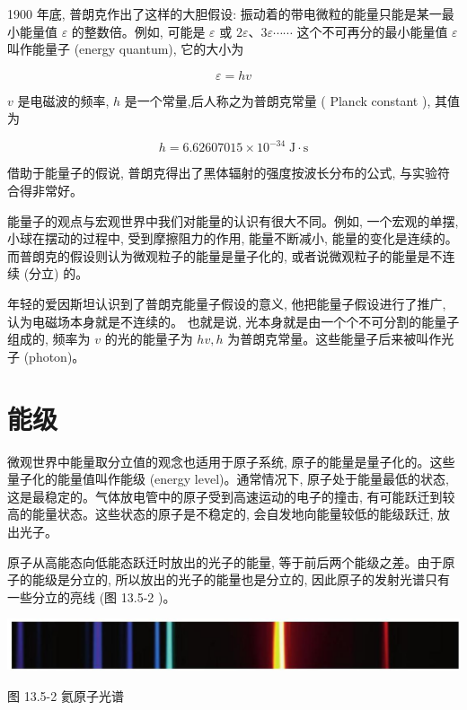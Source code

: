 \documentclass[10pt]{article}
\begin{document}
1900 年底, 普朗克作出了这样的大胆假设: 振动着的带电微粒的能量只能是某一最小能量值 \(\varepsilon\) 的整数倍。例如, 可能是 \(\varepsilon\) 或 \({2\varepsilon }\text{、}{3\varepsilon }\cdots \cdots\) 这个不可再分的最小能量值 \(\varepsilon\) 叫作能量子 (energy quantum), 它的大小为

\[
\varepsilon = {hv}
\]

\(v\) 是电磁波的频率, \(h\) 是一个常量,后人称之为普朗克常量 ( Planck constant ), 其值为

\[
h = {6.62607015} \times {10}^{-{34}}\mathrm{\;J} \cdot \mathrm{s}
\]

借助于能量子的假说, 普朗克得出了黑体辐射的强度按波长分布的公式, 与实验符合得非常好。

能量子的观点与宏观世界中我们对能量的认识有很大不同。例如, 一个宏观的单摆, 小球在摆动的过程中, 受到摩擦阻力的作用, 能量不断减小, 能量的变化是连续的。 而普朗克的假设则认为微观粒子的能量是量子化的, 或者说微观粒子的能量是不连续 (分立) 的。

年轻的爱因斯坦认识到了普朗克能量子假设的意义, 他把能量子假设进行了推广, 认为电磁场本身就是不连续的。 也就是说, 光本身就是由一个个不可分割的能量子组成的, 频率为 \(v\) 的光的能量子为 \({hv},h\) 为普朗克常量。这些能量子后来被叫作光子 (photon)。

\section*{能级}

微观世界中能量取分立值的观念也适用于原子系统, 原子的能量是量子化的。这些量子化的能量值叫作能级 (energy level)。通常情况下, 原子处于能量最低的状态, 这是最稳定的。气体放电管中的原子受到高速运动的电子的撞击, 有可能跃迁到较高的能量状态。这些状态的原子是不稳定的, 会自发地向能量较低的能级跃迁, 放出光子。

原子从高能态向低能态跃迁时放出的光子的能量, 等于前后两个能级之差。由于原子的能级是分立的, 所以放出的光子的能量也是分立的, 因此原子的发射光谱只有一些分立的亮线 (图 13.5-2 )。

\begin{center}
\includegraphics[max width=1.0\textwidth]{images/01911d5f-8e38-70c0-b5b8-2b399bd115b6_131_362217.jpg}
\end{center}

图 13.5-2 氦原子光谱
\end{document}
